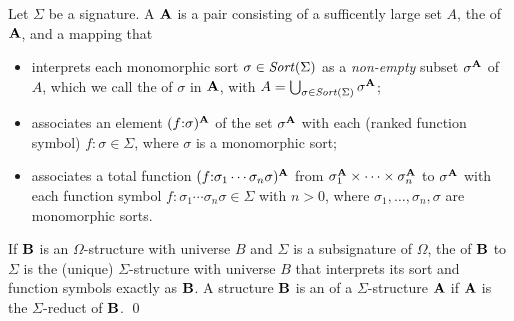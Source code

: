
\begin{definition}
\label{def:basic:structure}
Let $\Sigma$ be a signature.
A  $\mathbf{A}$ is a pair consisting of 
a sufficently large set $A$,  the  of $\mathbf{A}$, and 
a mapping that

\begin{itemize}
\item interprets
each monomorphic sort $\sigma \in \mathit{Sort}(\Sigma)$ as a \emph{non-empty} subset $\sigma^{\mathbf{A}}$ of $A$,
which we call the  of $\sigma$ in $\mathbf{A}$,
with $A = \bigcup_{\sigma \in \mathit{Sort}(\Sigma)} \sigma^{\mathbf{A}}$;

\item associates
an element $(f{:}\sigma)^{\mathbf{A}}$ of the set $\sigma^{\mathbf{A}}$ with
each (ranked function symbol) $f{:}\sigma \in \Sigma$,
where $\sigma$ is a monomorphic sort;

\item associates
a total function 
$(f{:}\sigma_1\cdots\sigma_n\sigma)^{\mathbf{A}}$ 
from $\sigma_1^{\mathbf{A}} \times \cdots \times \sigma_n^{\mathbf{A}}$ to
$\sigma^{\mathbf{A}}$ with each function symbol $f{:}\sigma_1\cdots\sigma_n\sigma \in \Sigma$ with $n > 0$,
where $\sigma_1, \ldots, \sigma_n, \sigma$ are monomorphic sorts.
\end{itemize}

If $\mathbf{B}$ is an $\Omega$-structure with universe $B$ and 
$\Sigma$ is a subsignature of $\Omega$,
the  of $\mathbf{B}$ to $\Sigma$ is the (unique) 
$\Sigma$-structure with universe $B$
that interprets its sort and function symbols exactly as $\mathbf{B}$.
A structure $\mathbf{B}$ is an  of a $\Sigma$-structure $\mathbf{A}$
if $\mathbf{A}$ is the $\Sigma$-reduct of $\mathbf{B}$.
\qed
\end{definition}

